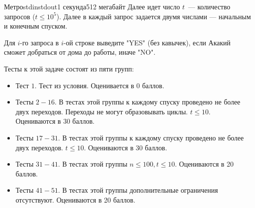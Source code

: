 \begin{problem}{Метро}{stdin}{stdout}{1 секунда}{512 мегабайт}
Далее идет число $t$~--- количество запросов ($t \le 10^5$). Далее в каждый запрос задается двумя числами --- начальным и конечным спуском.

\OutputFile
Для $i$-го запроса в $i$-ой строке выведите "YES" (без кавычек), если Акакий сможет добраться от дома до работы, иначе "NO".
\Examples

\begin{example}%
%
\end{example}

\Note
Тесты к этой задаче состоят из пяти групп:
\begin{itemize}
\item Тест $1$. Тест из условия. Оценивается в 0 баллов.
\item Тесты $2-16$. В тестах этой группы к каждому спуску проведено не более двух переходов. Переходы не могут образовывать циклы. $t \leq 10$. Оцениваются в 30 баллов.
\item Тесты $17-31$. В тестах этой группы к каждому спуску проведено не более двух переходов. $t \leq 10$. Оцениваются в 30 баллов.
\item Тесты $31-41$. В тестах этой группы $n \leq 100, t \leq 10$. Оцениваются в 20 баллов.
\item Тесты $41-51$. В тестах этой группы дополнительные ограничения отсутствуют. Оцениваются в 20 баллов.
\end{itemize}

\end{problem}

